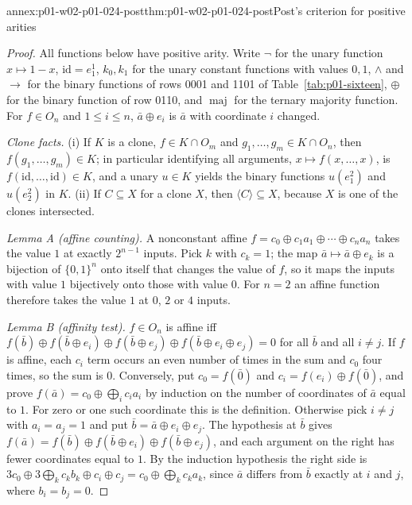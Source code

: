 \begin{annexitem}{annex:p01-w02-p01-024-post}{thm:p01-w02-p01-024-post}{Post's criterion for positive arities}
\begin{proof}
All functions below have positive arity.  Write \(\neg\) for the unary
function \(x\mapsto1-x\), \(\mathrm{id}=e^1_1\), \(k_0,k_1\) for the unary
constant functions with values \(0,1\), \(\land\) and \(\to\) for the binary
functions of rows 0001 and 1101 of Table~\ref{tab:p01-sixteen}, \(\oplus\)
for the binary function of row 0110, and \(\operatorname{maj}\) for the
ternary majority function.  For \(f\in O_n\) and \(1\leq i\leq n\),
\(\bar a\oplus e_i\) is \(\bar a\) with coordinate \(i\) changed.

\emph{Clone facts.}  (i) If \(K\) is a clone, \(f\in K\cap O_m\) and
\(g_1,\ldots,g_m\in K\cap O_n\), then \(f(g_1,\ldots,g_m)\in K\); in
particular identifying all arguments, \(x\mapsto f(x,\ldots,x)\), is
\(f(\mathrm{id},\ldots,\mathrm{id})\in K\), and a unary \(u\in K\) yields
the binary functions \(u(e^2_1)\) and \(u(e^2_2)\) in \(K\).  (ii) If
\(C\subseteq X\) for a clone \(X\), then \(\langle C\rangle\subseteq X\),
because \(X\) is one of the clones intersected.

\emph{Lemma A (affine counting).}  A nonconstant affine
\(f=c_0\oplus c_1a_1\oplus\cdots\oplus c_na_n\) takes the value \(1\) at
exactly \(2^{n-1}\) inputs.  Pick \(k\) with \(c_k=1\); the map
\(\bar a\mapsto\bar a\oplus e_k\) is a bijection of \(\{0,1\}^n\) onto
itself that changes the value of \(f\), so it maps the inputs with value
\(1\) bijectively onto those with value \(0\).  For \(n=2\) an affine
function therefore takes the value \(1\) at \(0\), \(2\) or \(4\) inputs.

\emph{Lemma B (affinity test).}  \(f\in O_n\) is affine iff
\(f(\bar b)\oplus f(\bar b\oplus e_i)\oplus f(\bar b\oplus e_j)\oplus
f(\bar b\oplus e_i\oplus e_j)=0\) for all \(\bar b\) and all \(i\neq j\).
If \(f\) is affine, each \(c_i\) term occurs an even number of times in the
sum and \(c_0\) four times, so the sum is \(0\).  Conversely, put
\(c_0=f(\bar0)\) and \(c_i=f(e_i)\oplus f(\bar0)\), and prove
\(f(\bar a)=c_0\oplus\bigoplus_ic_ia_i\) by induction on the number of
coordinates of \(\bar a\) equal to \(1\).  For zero or one such coordinate
this is the definition.  Otherwise pick \(i\neq j\) with \(a_i=a_j=1\) and
put \(\bar b=\bar a\oplus e_i\oplus e_j\).  The hypothesis at \(\bar b\)
gives \(f(\bar a)=f(\bar b)\oplus f(\bar b\oplus e_i)\oplus
f(\bar b\oplus e_j)\), and each argument on the right has fewer coordinates
equal to \(1\).  By the induction hypothesis the right side is
\(3c_0\oplus3\bigoplus_kc_kb_k\oplus c_i\oplus c_j=c_0\oplus
\bigoplus_kc_ka_k\), since \(\bar a\) differs from \(\bar b\) exactly at
\(i\) and \(j\), where \(b_i=b_j=0\).


\end{proof}
\end{annexitem}
